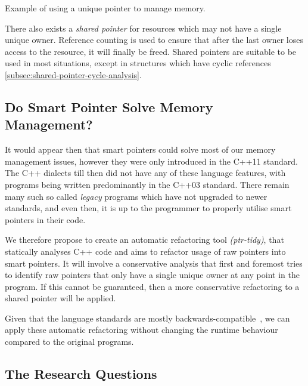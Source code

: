 \documentclass{proposal}
\begin{document}
    \begin{listing}
        \inputminted{c++}{code/first-example-unique.cpp}
        \caption{Example of using a unique pointer to manage memory.}
        \label{lst:first-example-unique}
    \end{listing}

    There also exists a \emph{shared pointer} for resources which may not have a single unique owner.
    Reference counting is used to ensure that after the last owner loses access to the resource, it will finally be freed.
    Shared pointers are suitable to be used in most situations, except in structures which have cyclic references \autoref{subsec:shared-pointer-cycle-analysis}.

    \subsection{Do Smart Pointer Solve Memory Management?}\label{subsec:do-smart-pointer-solve-memory-management?}

    It would appear then that smart pointers could solve most of our memory management issues, however they were only introduced in the C++11 standard.
    The C++ dialects till then did not have any of these language features, with programs being written predominantly in the C++03 standard.
    There remain many such so called \emph{legacy} programs which have not upgraded to newer standards, and even then, it is up to the programmer to properly utilise smart pointers in their code.

    We therefore propose to create an automatic refactoring tool \emph{(ptr-tidy)}, that statically analyses C++ code and aims to refactor usage of raw pointers into smart pointers.
    It will involve a conservative analysis that first and foremost tries to identify raw pointers that only have a single unique owner at any point in the program.
    If this cannot be guaranteed, then a more conservative refactoring to a shared pointer will be applied.

    Given that the language standards are mostly backwards-compatible~\cite{Winters2020}, we can apply these automatic refactoring without changing the runtime behaviour compared to the original programs.


    \subsection{The Research Questions}\label{subsec:the-research-questions}
\end{document}
